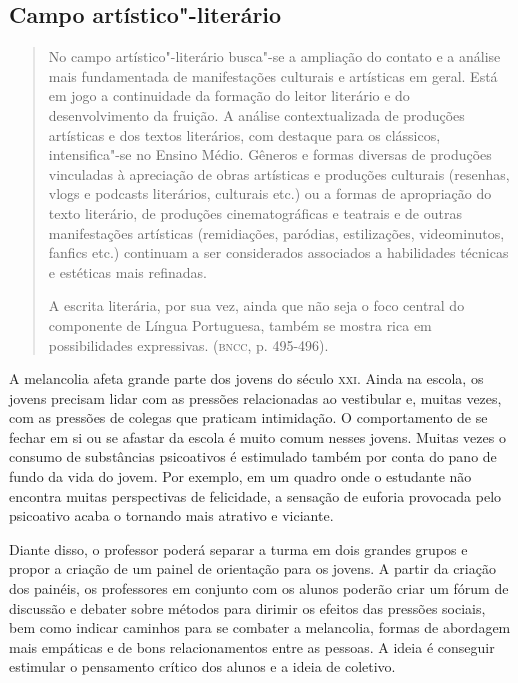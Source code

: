 \documentclass[11pt]{extarticle}
\begin{document}
\subsection{Campo artístico"-literário}

\begin{quote}
No campo artístico"-literário busca"-se a ampliação do contato e a
análise mais fundamentada de manifestações culturais e artísticas em
geral. Está em jogo a continuidade da formação do leitor literário e do
desenvolvimento da fruição. A análise contextualizada de produções
artísticas e dos textos literários, com destaque para os clássicos,
intensifica"-se no Ensino Médio. Gêneros e formas diversas de produções
vinculadas à apreciação de obras artísticas e produções culturais
(resenhas, vlogs e podcasts literários, culturais etc.) ou a formas de
apropriação do texto literário, de produções cinematográficas e teatrais
e de outras manifestações artísticas (remidiações, paródias,
estilizações, videominutos, fanfics etc.) continuam a ser considerados
associados a habilidades técnicas e estéticas mais refinadas.

A escrita literária, por sua vez, ainda que não seja o foco central do
componente de Língua Portuguesa, também se mostra rica em possibilidades
expressivas. (\textsc{bncc}, p. 495-496).
\end{quote}

A melancolia afeta grande parte dos jovens do século \textsc{xxi}. Ainda na
escola, os jovens precisam lidar com as pressões relacionadas ao
vestibular e, muitas vezes, com as pressões de colegas que praticam
intimidação. O comportamento de se fechar em si ou se afastar da
escola é muito comum nesses jovens. Muitas vezes o consumo de
substâncias psicoativos é estimulado também por conta do pano de fundo
da vida do jovem. Por exemplo, em um quadro onde o estudante não
encontra muitas perspectivas de felicidade, a sensação de euforia
provocada pelo psicoativo acaba o tornando mais atrativo e viciante.

Diante disso, o professor poderá separar a turma em dois grandes grupos
e propor a criação de um painel de orientação para os jovens. A partir
da criação dos painéis, os professores em conjunto com os alunos poderão
criar um fórum de discussão e debater sobre métodos para dirimir os
efeitos das pressões sociais, bem como indicar caminhos para se combater
a melancolia, formas de abordagem mais empáticas e de bons
relacionamentos entre as pessoas. A ideia é conseguir estimular o
pensamento crítico dos alunos e a ideia de coletivo.
\end{document}
